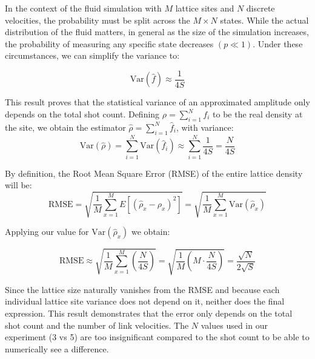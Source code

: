 In the context of the fluid simulation with $M$ lattice sites and $N$ discrete velocities, the probability must be split across the $M \times N$ states.
While the actual distribution of the fluid matters, in general as the size of the simulation increases, the probability of measuring any specific state decreases $(p\ll1)$.
Under these circumstances, we can simplify the variance to:

\begin{equation*}
    \text{Var}(\hat{f}) \approx \frac{1}{4S}
\end{equation*}

This result proves that the statistical variance of an approximated amplitude only depends on the total shot count.
Defining $\rho = \sum_{i=1}^{N}f_i$ to be the real density at the site, we obtain the estimator $\hat{\rho} = \sum_{i=1}^{N}\hat{f}_i$, with variance:
\begin{equation*}
    \text{Var}(\hat{\rho}) = \sum_{i=1}^N \text{Var}(\hat{f}_{i}) \approx \sum_{i=1}^N \frac{1}{4S} = \frac{N}{4S}
\end{equation*}

By definition, the Root Mean Square Error (RMSE) of the entire lattice density will be:
\begin{equation*}
    \text{RMSE} = \sqrt{ \frac{1}{M} \sum_{x=1}^{M} E\left[ (\hat{\rho}_x - \rho_x)^2 \right] } = \sqrt{ \frac{1}{M} \sum_{x=1}^{M} \text{Var}(\hat{\rho}_x) }
\end{equation*}

Applying our value for $\text{Var}(\hat{\rho}_x)$ we obtain:

\begin{equation*}
    \text{RMSE} \approx \sqrt{ \frac{1}{M} \sum_{x=1}^{M} \left( \frac{N}{4S} \right) } = \sqrt{ \frac{1}{M} \left( M \cdot \frac{N}{4S} \right) } = \frac{\sqrt{N}}{2\sqrt{S}}
\end{equation*}

Since the lattice size naturally vanishes from the RMSE and because each individual lattice site variance does not depend on it, neither does the final expression.
This result demonstrates that the error only depends on the total shot count and the number of link velocities.
The $N$ values used in our experiment (3 vs 5) are too insignificant compared to the shot count to be able to numerically see a difference.